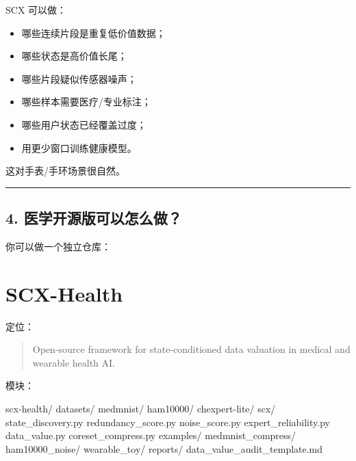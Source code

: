 \documentclass[
  12pt,
]{ctexart}
\newenvironment{Shaded}{}{}
\newcommand{\NormalTok}[1]{#1}
\providecommand{\tightlist}{%
  \setlength{\itemsep}{0pt}\setlength{\parskip}{0pt}}
\begin{document}
SCX 可以做：

\begin{itemize}
\tightlist
\item
  哪些连续片段是重复低价值数据；
\item
  哪些状态是高价值长尾；
\item
  哪些片段疑似传感器噪声；
\item
  哪些样本需要医疗/专业标注；
\item
  哪些用户状态已经覆盖过度；
\item
  用更少窗口训练健康模型。
\end{itemize}

这对手表/手环场景很自然。

\begin{center}\rule{0.5\linewidth}{0.5pt}\end{center}

\subsection{4.
医学开源版可以怎么做？}\label{ux533bux5b66ux5f00ux6e90ux7248ux53efux4ee5ux600eux4e48ux505a}

你可以做一个独立仓库：

\section{\texorpdfstring{\textbf{SCX-Health}}{SCX-Health}}\label{scx-health}

定位：

\begin{quote}
Open-source framework for state-conditioned data valuation in medical
and wearable health AI.
\end{quote}

模块：

\begin{Shaded}
\begin{Highlighting}[]
\NormalTok{scx{-}health/}
\NormalTok{  datasets/}
\NormalTok{    medmnist/}
\NormalTok{    ham10000/}
\NormalTok{    chexpert{-}lite/}
\NormalTok{  scx/}
\NormalTok{    state\_discovery.py}
\NormalTok{    redundancy\_score.py}
\NormalTok{    noise\_score.py}
\NormalTok{    expert\_reliability.py}
\NormalTok{    data\_value.py}
\NormalTok{    coreset\_compress.py}
\NormalTok{  examples/}
\NormalTok{    medmnist\_compress/}
\NormalTok{    ham10000\_noise/}
\NormalTok{    wearable\_toy/}
\NormalTok{  reports/}
\NormalTok{    data\_value\_audit\_template.md}
\end{Highlighting}
\end{Shaded}
\end{document}
